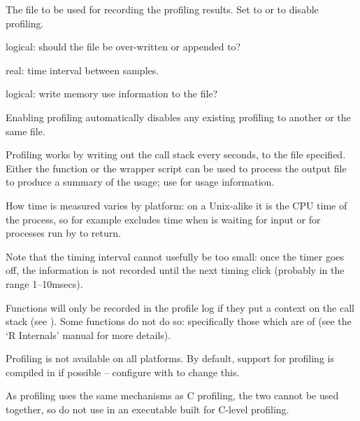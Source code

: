 %
\begin{Arguments}
\begin{ldescription}
\item[\code{filename}] 
The file to be used for recording the profiling results.
Set to  or  to disable profiling.

\item[\code{append}] 
logical: should the file be over-written or appended to?

\item[\code{interval}] 
real: time interval between samples.

\item[\code{memory.profiling}] logical: write memory use information to the file?
\end{ldescription}
\end{Arguments}
%
\begin{Details}\relax
Enabling profiling automatically disables any existing profiling to
another or the same file.

Profiling works by writing out the call stack every 
seconds, to the file specified.  Either the 
function or the wrapper script  can be used to
process the output file to produce a summary of the usage; use
 for usage information.

How time is measured varies by platform: on a Unix-alike it is the CPU
time of the \R{} process, so for example excludes time when \R{} is waiting
for input or for processes run by  to return.

Note that the timing interval cannot usefully be too small: once the
timer goes off, the information is not recorded until the next timing
click (probably in the range 1--10msecs).

Functions will only be recorded in the profile log if they put a
context on the call stack (see ).  Some
 functions do not do so: specifically those which are
of   (see the `R Internals' manual
for more details).
\end{Details}
%
\begin{Note}\relax
Profiling is not available on all platforms.  By default,
support for profiling is compiled in if possible -- configure \R{} with
 to change this.

As \R{} profiling uses the same mechanisms as C profiling, the two
cannot be used together, so do not use  in an executable
built for C-level profiling.
\end{Note}

